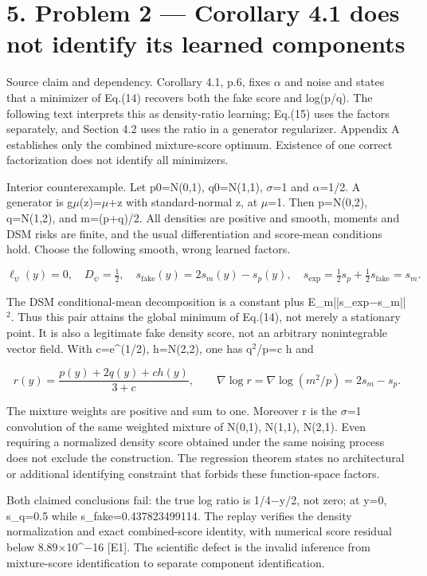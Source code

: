 \documentclass[10pt]{article}
\begin{document}
\section*{5. Problem 2 — Corollary 4.1 does not identify its learned components}
Source claim and dependency. Corollary 4.1, p.6, fixes \(\alpha\) and noise and states that a minimizer of Eq.(14) recovers both the fake score and log(p/q). The following text interprets this as density-ratio learning; Eq.(15) uses the factors separately, and Section 4.2 uses the ratio in a generator regularizer. Appendix A establishes only the combined mixture-score optimum. Existence of one correct factorization does not identify all minimizers.\par
Interior counterexample. Let p0=N(0,1), q0=N(1,1), \(\sigma\)=1 and \(\alpha\)=1/2. A generator is g\(\mu\)(z)=\(\mu\)+z with standard-normal z, at \(\mu\)=1. Then p=N(0,2), q=N(1,2), and m=(p+q)/2. All densities are positive and smooth, moments and DSM risks are finite, and the usual differentiation and score-mean conditions hold. Choose the following smooth, wrong learned factors.\par
\[\ell_\psi(y)=0,\quad D_\psi=\tfrac12,\quad
s_{\mathrm{fake}}(y)=2s_m(y)-s_p(y),\quad
s_{\mathrm{exp}}=\tfrac12s_p+\tfrac12s_{\mathrm{fake}}=s_m.\]\par
The DSM conditional-mean decomposition is a constant plus E\_m||s\_exp\(-\)s\_m||\({}^{2}\). Thus this pair attains the global minimum of Eq.(14), not merely a stationary point. It is also a legitimate fake density score, not an arbitrary nonintegrable vector field. With c=e\textasciicircum{}(1/2), h=N(2,2), one has q\({}^{2}\)/p=c h and\par
\[r(y)=\frac{p(y)+2q(y)+c h(y)}{3+c},\qquad
\nabla\log r=\nabla\log(m^2/p)=2s_m-s_p.\]\par
The mixture weights are positive and sum to one. Moreover r is the \(\sigma\)=1 convolution of the same weighted mixture of N(0,1), N(1,1), N(2,1). Even requiring a normalized density score obtained under the same noising process does not exclude the construction. The regression theorem states no architectural or additional identifying constraint that forbids these function-space factors.\par
Both claimed conclusions fail: the true log ratio is 1/4\(-\)y/2, not zero; at y=0, s\_q=0.5 while s\_fake=0.437823499114. The replay verifies the density normalization and exact combined-score identity, with numerical score residual below 8.89\(\times\)10\textasciicircum{}\(-\)16 [E1]. The scientific defect is the invalid inference from mixture-score identification to separate component identification.\par
\end{document}
